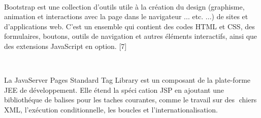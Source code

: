 \documentclass{article}
\begin{document}
{\begin{minipage}{0.75\textwidth}
\vspace{0.7cm}
\end{minipage}\\
\begin{minipage}{0.2\textwidth}
	\begin{minipage}{\linewidth}
	\end{minipage}
\end{minipage}
\hfill
\begin{minipage}{0.75\textwidth}
\vspace{0.7cm}
	Bootstrap est une collection d'outils utile à la création du design (graphisme, animation et interactions
avec la page dans le navigateur ... etc. ...) de sites et d'applications web. C'est un ensemble qui contient
des codes HTML et CSS, des formulaires, boutons, outils de navigation et autres éléments interactifs, ainsi
que des extensions JavaScript en option. [7]
\\
\vspace{0.7cm}
\end{minipage}\\
\begin{minipage}{0.2\textwidth}
	\begin{minipage}{\linewidth}
	\end{minipage}
\end{minipage}
\hfill
\begin{minipage}{0.75\textwidth}
\vspace{0.7cm}
	La JavaServer Pages Standard Tag Library est un composant de la plate-forme JEE
de développement. Elle étend la spécication JSP en ajoutant une bibliothéque de
balises pour les taches courantes, comme le travail sur des chiers XML, l'exécution
conditionnelle, les boucles et l'internationalisation.
\\
\end{minipage}\\

}
\end{document}
